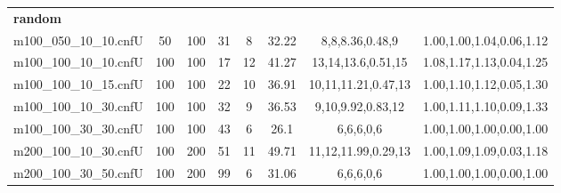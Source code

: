 \begin{table*}[t!]
{\begin{tabular}{lccccccc}
 \midrule
 {\bf random} &  &  &  &  & & \\ 
 m100\_050\_10\_10.cnfU & 50 & 100 & 31 & 8 & 32.22 & 8,8,8.36,0.48,9 & 1.00,1.00,1.04,0.06,1.12 \\ 
 m100\_100\_10\_10.cnfU & 100 & 100 & 17 & 12 & 41.27 & 13,14,13.6,0.51,15 & 1.08,1.17,1.13,0.04,1.25 \\ 
 m100\_100\_10\_15.cnfU & 100 & 100 & 22 & 10 & 36.91 & 10,11,11.21,0.47,13 & 1.00,1.10,1.12,0.05,1.30 \\ 
 m100\_100\_10\_30.cnfU & 100 & 100 & 32 & 9 & 36.53 & 9,10,9.92,0.83,12 & 1.00,1.11,1.10,0.09,1.33 \\ 
 m100\_100\_30\_30.cnfU & 100 & 100 & 43 & 6 & 26.1 & 6,6,6,0,6 & 1.00,1.00,1.00,0.00,1.00 \\ 
 m200\_100\_10\_30.cnfU & 100 & 200 & 51 & 11 & 49.71 & 11,12,11.99,0.29,13 & 1.00,1.09,1.09,0.03,1.18 \\ 
 m200\_100\_30\_50.cnfU & 100 & 200 & 99 & 6 & 31.06 & 6,6,6,0,6 & 1.00,1.00,1.00,0.00,1.00 \\
              

\end{tabular}}
\end{table*}
